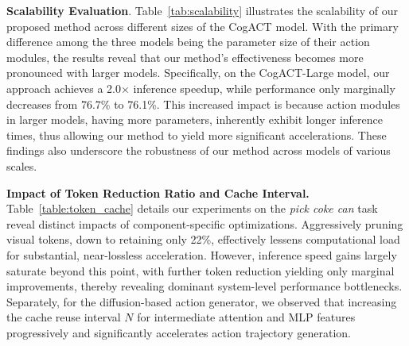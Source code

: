 \noindent \textbf{Scalability Evaluation}. Table~\ref{tab:scalability} illustrates the scalability of our proposed method across different sizes of the CogACT model. With the primary difference among the three models being the parameter size of their action modules, the results reveal that our method's effectiveness becomes more pronounced with larger models. Specifically, on the CogACT-Large model, our approach achieves a 2.0$\times$ inference speedup, while performance only marginally decreases from 76.7\% to 76.1\%. This increased impact is because action modules in larger models, having more parameters, inherently exhibit longer inference times, thus allowing our method to yield more significant accelerations. These findings also underscore the robustness of our method across models of various scales.


\noindent \textbf{Impact of Token Reduction Ratio and Cache Interval.} Table~\ref{table:token_cache} details our experiments on the \emph{pick coke can} task reveal distinct impacts of component-specific optimizations. Aggressively pruning visual tokens, down to retaining only 22\%, effectively lessens computational load for substantial, near-lossless acceleration. However, inference speed gains largely saturate beyond this point, with further token reduction yielding only marginal improvements, thereby revealing dominant system-level performance bottlenecks. Separately, for the diffusion-based action generator, we observed that increasing the cache reuse interval $N$ for intermediate attention and MLP features progressively and significantly accelerates action trajectory generation.






